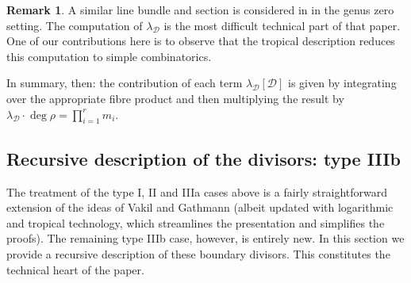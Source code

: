 \documentclass[11pt]{amsart}
\newcommand{\Dcal}{\mathcal{D}}
\theoremstyle{definition}
\theoremstyle{definition}
\newtheorem{remark}[thm]{Remark}
\begin{document}
\begin{remark} A similar line bundle and section is considered in \cite{Ga} in the genus zero setting. The computation of $\lambda_{\Dcal}$ is the most difficult technical part of that paper. One of our contributions here is to observe that the tropical description reduces this computation to simple combinatorics.\end{remark}

In summary, then: the contribution of each term $\lambda_\Dcal [\Dcal]$ is given by integrating over the appropriate fibre product and then multiplying the result by $\lambda_\Dcal \cdot \deg\rho = \prod_{i=1}^r m_i$.

\subsection{Recursive description of the divisors: type IIIb} The treatment of the type I, II and IIIa cases above is a fairly straightforward extension of the ideas of Vakil and Gathmann (albeit updated with logarithmic and tropical technology, which streamlines the presentation and simplifies the proofs). The remaining type IIIb case, however, is entirely new. In this section we provide a recursive description of these boundary divisors. This constitutes the technical heart of the paper.
\end{document}
